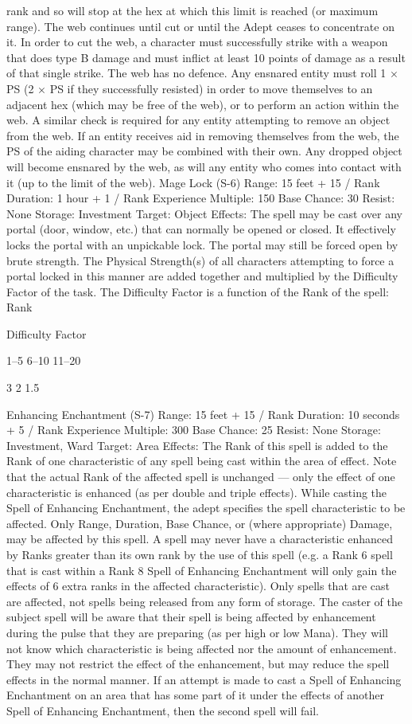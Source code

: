 \documentclass[a4paper]{article}
\begin{document}
\begin{multicols}{3}
rank and so will stop at the hex at which this limit
is reached (or maximum range).
The web continues until cut or until the Adept
ceases to concentrate on it. In order to cut the web,
a character must successfully strike with a weapon
that does type B damage and must inflict at least 10
points of damage as a result of that single strike.
The web has no defence.
Any ensnared entity must roll 1 × PS (2 × PS if
they successfully resisted) in order to move themselves to an adjacent hex (which may be free of the
web), or to perform an action within the web. A
similar check is required for any entity attempting
to remove an object from the web. If an entity
receives aid in removing themselves from the web,
the PS of the aiding character may be combined
with their own. Any dropped object will become
ensnared by the web, as will any entity who comes
into contact with it (up to the limit of the web).
Mage Lock (S-6)
Range: 15 feet + 15 / Rank
Duration: 1 hour + 1 / Rank
Experience Multiple: 150
Base Chance: 30%
Resist: None
Storage: Investment
Target: Object
Effects: The spell may be cast over any portal
(door, window, etc.) that can normally be opened
or closed. It effectively locks the portal with an
unpickable lock. The portal may still be forced
open by brute strength. The Physical Strength(s) of
all characters attempting to force a portal locked in
this manner are added together and multiplied by
the Difficulty Factor of the task. The Difficulty
Factor is a function of the Rank of the spell:
Rank

Difficulty Factor

1–5
6–10
11–20

3
2
1.5

Enhancing Enchantment (S-7)
Range: 15 feet + 15 / Rank
Duration: 10 seconds + 5 / Rank
Experience Multiple: 300
Base Chance: 25%
Resist: None
Storage: Investment, Ward
Target: Area
Effects: The Rank of this spell is added to the Rank
of one characteristic of any spell being cast within
the area of effect. Note that the actual Rank of the
affected spell is unchanged — only the effect of
one characteristic is enhanced (as per double and
triple effects).
While casting the Spell of Enhancing Enchantment, the adept specifies the spell characteristic to
be affected. Only Range, Duration, Base Chance,
or (where appropriate) Damage, may be affected
by this spell.
A spell may never have a characteristic enhanced
by Ranks greater than its own rank by the use of
this spell (e.g. a Rank 6 spell that is cast within a
Rank 8 Spell of Enhancing Enchantment will only
gain the effects of 6 extra ranks in the affected
characteristic).
Only spells that are cast are affected, not spells
being released from any form of storage. The
caster of the subject spell will be aware that their
spell is being affected by enhancement during the
pulse that they are preparing (as per high or low
Mana). They will not know which characteristic is
being affected nor the amount of enhancement.
They may not restrict the effect of the enhancement, but may reduce the spell effects in the normal manner. If an attempt is made to cast a Spell of
Enhancing Enchantment on an area that has some
part of it under the effects of another Spell of Enhancing Enchantment, then the second spell will
fail.


\end{multicols}
\end{document}
